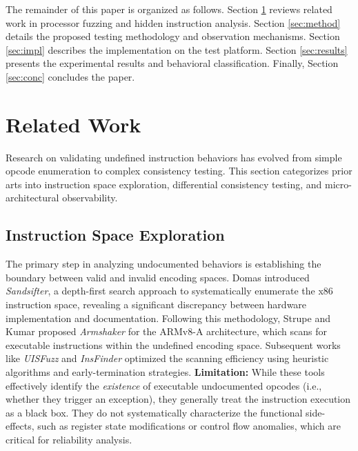 \documentclass[pdflatex,sn-mathphys]{sn-jnl}%
\theoremstyle{thmstyleone}%
\theoremstyle{thmstyletwo}%
\theoremstyle{thmstylethree}%
\begin{document}
The remainder of this paper is organized as follows. Section \ref{sec:related} reviews related work in processor fuzzing and hidden instruction analysis. Section \ref{sec:method} details the proposed testing methodology and observation mechanisms. Section \ref{sec:impl} describes the implementation on the test platform. Section \ref{sec:results} presents the experimental results and behavioral classification. Finally, Section \ref{sec:conc} concludes the paper.

\section{Related Work}\label{sec:related}

Research on validating undefined instruction behaviors has evolved from simple opcode enumeration to complex consistency testing. This section categorizes prior arts into instruction space exploration, differential consistency testing, and micro-architectural observability.

\subsection{Instruction Space Exploration}
The primary step in analyzing undocumented behaviors is establishing the boundary between valid and invalid encoding spaces. Domas \cite{domas2017breaking} introduced \textit{Sandsifter}, a depth-first search approach to systematically enumerate the x86 instruction space, revealing a significant discrepancy between hardware implementation and documentation. Following this methodology, Strupe and Kumar \cite{strupe2020uncovering} proposed \textit{Armshaker} for the ARMv8-A architecture, which scans for executable instructions within the undefined encoding space. Subsequent works like \textit{UISFuzz} \cite{li2019uisfuzz} and \textit{InsFinder} \cite{dong2024ins} optimized the scanning efficiency using heuristic algorithms and early-termination strategies.
\textbf{Limitation:} While these tools effectively identify the \textit{existence} of executable undocumented opcodes (i.e., whether they trigger an exception), they generally treat the instruction execution as a black box. They do not systematically characterize the functional side-effects, such as register state modifications or control flow anomalies, which are critical for reliability analysis.
\end{document}
